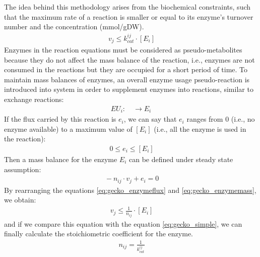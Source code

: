 The idea behind this methodology arises from the biochemical constraints, such that the maximum rate of a reaction is smaller or equal to its enzyme's turnover number and the concentration (mmol/gDW).
\begin{align}
 \label{eq:gecko_simple}
 \ v_{j} \leq k_{cat}^{ij} \cdot [E_{i}]
\end{align}
Enzymes in the reaction equations must be considered as pseudo-metabolites because they do not affect the mass balance of the reaction, i.e., enzymes are not consumed in the reactions but they are occupied for a short period of time. To maintain mass balances of enzymes, an overall enzyme usage pseudo-reaction is introduced into system in order to supplement enzymes into reactions, similar to exchange reactions:
\begin{align}
 \label{eq:gecko_suppelement}
 \  EU_i: \quad \to E_i
 \
\end{align}
If the flux carried by this reaction is $e_i$, we can say that $e_i$ ranges from 0 (i.e., no enzyme available) to a maximum value of $[E_i]$ (i.e., all the enzyme is used in the reaction):
\begin{align}
 \label{eq:gecko_enzymeflux}
 \  0 \leq e_i \leq [E_i]
\end{align}
Then a mass balance for the enzyme $E_i$ can be defined under steady state assumption:
\begin{align}
 \label{eq:gecko_enzymemass}
 \  -n_{ij} \cdot v_j + e_i = 0
\end{align}
By rearranging the equations \ref{eq:gecko_enzymeflux} and \ref{eq:gecko_enzymemass}, we obtain:
\begin{align}
 \label{eq:gecko_enzymemassrearranged}
 \ v_j \leq \frac{1}{n_{ij}} \cdot [E_i]
\end{align}
and if we compare this equation with the equation \ref{eq:gecko_simple}, we can finally calculate the stoichiometric coefficient for the enzyme.
\begin{align}
 \label{eq:gecko_enzymestoichiometry}
 \ n_{ij}=\frac{1}{k_{cat}^{ij}}
\end{align}

